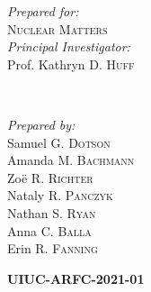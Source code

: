 \begin{titlepage}
       \begin{minipage}{0.45\textwidth}
               \begin{flushleft}
                       \large
                       \textit{Prepared for:}\\
                       \textsc{Nuclear Matters}%
                       \vspace{4mm}\\ %
                       \textit{Principal Investigator:}\\ %
                       Prof. Kathryn D. \textsc{Huff} %
                \end{flushleft}
       \end{minipage}
       ~
       \begin{minipage}{0.45\textwidth}
               \begin{flushright}
                       \large
                       \textit{Prepared by:}\\
                       Samuel G. \textsc{Dotson}\\ %
                       Amanda M. \textsc{Bachmann}\\ %
                       Zo\"{e} R. \textsc{Richter}\\ %
                       Nataly R. \textsc{Panczyk}\\ %
                       Nathan S. \textsc{Ryan}\\ %
                       Anna C. \textsc{Balla}\\ %
                       Erin R. \textsc{Fanning}
               \end{flushright}
    \end{minipage}


    \vspace{.5cm}
    \textsc{\LARGE\bfseries UIUC-ARFC-2021-01} %
    \vspace{0.2cm}



\end{titlepage}
